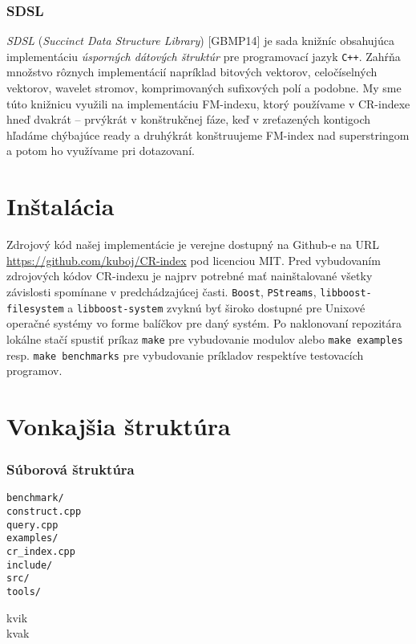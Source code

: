 \subsubsection{SDSL}
\emph{SDSL} (\emph{Succinct Data Structure Library}) [GBMP14] je sada knižníc obsahujúca implementáciu \emph{úsporných dátových štruktúr} pre programovací jazyk \texttt{C++}. Zahŕňa množstvo rôznych implementácií napríklad bitových vektorov, celočíselných vektorov, wavelet stromov, komprimovaných sufixových polí a podobne. My sme túto knižnicu využili na implementáciu FM-indexu, ktorý používame v CR-indexe hneď dvakrát -- prvýkrát v konštrukčnej fáze, keď v zreťazených kontigoch hľadáme chýbajúce ready a druhýkrát konštruujeme FM-index nad superstringom a potom ho využívame pri dotazovaní.

\section{Inštalácia}
Zdrojový kód našej implementácie je verejne dostupný na Github-e na URL \url{https://github.com/kuboj/CR-index} pod licenciou MIT. Pred vybudovaním zdrojových kódov CR-indexu je najprv potrebné mať nainštalované všetky závislosti spomínane v predchádzajúcej časti. \texttt{Boost}, \texttt{PStreams}, \texttt{libboost-filesystem} a \texttt{libboost-system} zvyknú byť široko dostupné pre Unixové operačné systémy vo forme balíčkov pre daný systém. Po naklonovaní repozitára lokálne stačí spustiť príkaz \texttt{make} pre vybudovanie modulov alebo \texttt{make examples} resp. \texttt{make benchmarks} pre vybudovanie príkladov respektíve testovacích programov.

\section{Vonkajšia štruktúra}

\subsubsection{Súborová štruktúra}

\begin{minipage}[t]{0.3\linewidth}
    \vspace{0pt}
    \texttt{benchmark/} \\
    \hspace*{2em}\texttt{construct.cpp} \\
    \hspace*{2em}\texttt{query.cpp} \\
    \texttt{examples/}  \\
    \hspace*{2em}\texttt{cr\_index.cpp} \\
    \texttt{include/}   \\
    \texttt{src/}       \\
    \texttt{tools/}     \\
\end{minipage}
\hspace{0.5cm}
\begin{minipage}[t]{0.65\linewidth}
    \vspace{0pt}
    kvik \\
    kvak
\end{minipage}

